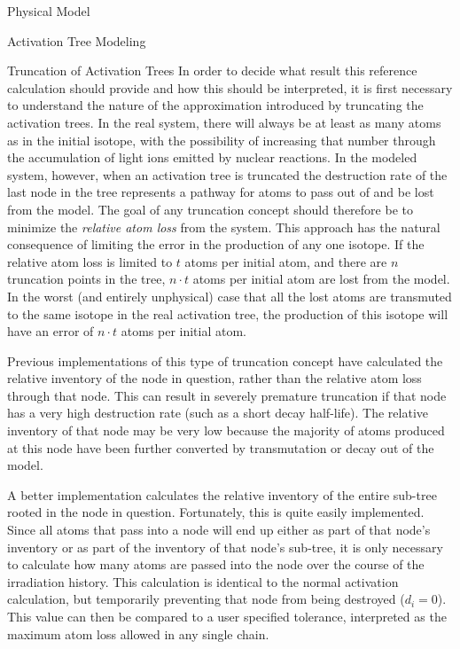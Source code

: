\begin{chapter}{Physical Model\label{chap:physical}}
\begin{section}{Activation Tree Modeling\label{sec:physical.chains}}
\begin{subsection}{Truncation of Activation Trees\label{sec:physical.chains.trunc}}
    In order to decide what result this reference calculation should
    provide and how this should be interpreted, it is first necessary
    to understand the nature of the approximation introduced by
    truncating the activation trees.  In the real system, there will
    always be at least as many atoms as in the initial isotope, with
    the possibility of increasing that number through the accumulation
    of light ions emitted by nuclear reactions.  In the modeled
    system, however, when an activation tree is truncated the
    destruction rate of the last node in the tree represents a pathway
    for atoms to pass out of and be lost from the model.  The goal of
    any truncation concept should therefore be to minimize the
    \textsl{relative atom loss} from the system.  This approach has
    the natural consequence of limiting the error in the production of
    any one isotope.  If the relative atom loss is limited to $t$
    atoms per initial atom, and there are $n$ truncation points in the
    tree, $n\cdot t$ atoms per initial atom are lost from the model.
    In the worst (and entirely unphysical) case that all the lost
    atoms are transmuted to the same isotope in the real activation
    tree, the production of this isotope will have an error of $n
    \cdot t$ atoms per initial atom.
    
    Previous implementations of this type of truncation concept have
    calculated the relative inventory of the node in question, rather
    than the relative atom loss through that node\cite{DKR}.  This can
    result in severely premature truncation if that node has a very
    high destruction rate (such as a short decay half-life).  The
    relative inventory of that node may be very low because the
    majority of atoms produced at this node have been further
    converted by transmutation or decay out of the model.
    
    A better implementation calculates the relative inventory of the
    entire sub-tree rooted in the node in question.  Fortunately, this
    is quite easily implemented.  Since all atoms that pass into a
    node will end up either as part of that node's inventory or as
    part of the inventory of that node's sub-tree, it is only
    necessary to calculate how many atoms are passed into the node
    over the course of the irradiation history.  This calculation is
    identical to the normal activation calculation, but temporarily
    preventing that node from being destroyed ($d_i = 0$).  This value
    can then be compared to a user specified tolerance, interpreted as
    the maximum atom loss allowed in any single chain.
    

\end{subsection}
\end{section}
\end{chapter}
